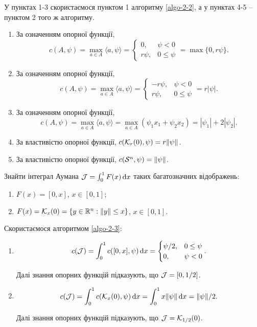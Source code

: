 \begin{solution}
	У пунктах 1-3 скористаємося пунктом 1 алгоритму \ref{algo-2-2},  а у пунктах 4-5 -- пунктом 2 того ж алгоритму.
	\begin{enumerate}
		\item За означенням опорної функції, \[ c(A, \psi) = \max_{a \in A} \langle a, \psi \rangle = \begin{cases} 0, & \psi < 0 \\ r \psi, & 0 \le \psi \end{cases} = \max \{ 0, r \psi \}. \]

		\item За означенням опорної функції, \[ c(A, \psi) = \max_{a \in A} \langle a, \psi \rangle = \begin{cases} - r \psi, & \psi < 0 \\ r \psi, & 0 \le \psi \end{cases} = r |\psi |. \]

		\item За означенням опорної функції, \[ c(A, \psi) = \max_{a \in A} \langle a, \psi \rangle = \max_{a \in A} (\psi_1 x_1 + \psi_2 x_2) = |\psi_1| + 2 |\psi_2|. \]

		\item За властивістю опорної функції, $c(\mathcal{K}_r (0), \psi) = r \| \psi \|$.

		\item За властивістю опорної функції, $c(\mathcal{S}^n, \psi) = \| \psi \|$.
	\end{enumerate}
\end{solution}

\begin{problem}
	Знайти інтеграл Аумана $\mathcal{J} = \int_0^1 F(x) \mathop{}\!\mathrm{d} x$ таких багатозначних відображень:

	\begin{enumerate}
		\item $F(x) = [0, x]$, $x \in [0, 1]$;

		\item $F(x) = \mathcal{K}_x (0) = \{ y \in \mathbb{R}^n: \|y\| \le x \}$, $x \in [0, 1]$.
	\end{enumerate}
\end{problem}

\begin{solution}
	Скористаємося алгоритмом \ref{algo-2-3}:
	\begin{enumerate}
		\item \[c(\mathcal{J}) = \int_0^1 c([0, x], \psi) \mathop{}\!\mathrm{d} x = \begin{cases} \psi / 2, & 0 \le \psi \\ 0, & \psi < 0 \end{cases}. \]

		Далі знання опорних функцій підказують, що $\mathcal{J} = [0, 1 / 2]$.

		\item \[c(\mathcal{J}) = \int_0^1 c(\mathcal{K}_x(0), \psi) \mathop{}\!\mathrm{d} x = \int_0^1 x \| \psi \| \mathop{}\!\mathrm{d} x = \| \psi \| / 2. \]

		Далі знання опорних функцій підказують, що $\mathcal{J} = \mathcal{K}_{1 / 2} (0)$.
	\end{enumerate}
\end{solution}

